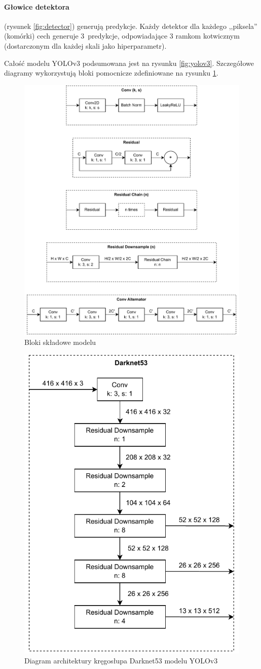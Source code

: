 \documentclass{article}
\begin{document}
\paragraph{Głowice detektora} (rysunek \ref{fig:detector}) generują predykcje. Każdy detektor dla każdego ,,piksela'' (komórki) cech generuje 3~predykcje, odpowiadające 3 ramkom kotwicznym (dostarczonym dla każdej skali jako hiperparametr).

Całość modelu YOLOv3 podsumowana jest na rysunku \ref{fig:yolov3}. Szczegółowe diagramy wykorzystują bloki pomocnicze zdefiniowane na rysunku \ref{fig:helpers}.

\begin{figure}[!h]
    \centering \includegraphics[width=0.75\linewidth]{helpers}
    \caption{Bloki składowe modelu}
    \label{fig:helpers}
\end{figure}

\begin{figure}[!h]
    \centering \includegraphics[width=0.5\linewidth]{darknet}
    \caption{Diagram architektury kręgosłupa Darknet53 modelu YOLOv3}
    \label{fig:darknet}
\end{figure}
\end{document}
